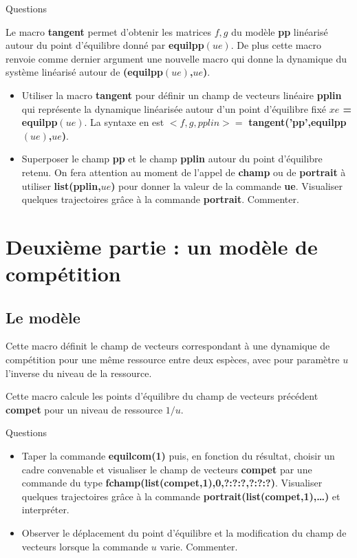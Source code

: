 \centerline{{\sc Questions}}

Le macro {\bf tangent} permet d'obtenir les matrices $f,g$
du mod\`ele {\bf pp}
lin\'earis\'e autour du point d'\'equilibre donn\'e par {\bf equilpp$(ue)$}. 
De plus cette macro renvoie comme dernier argument une nouvelle macro 
qui donne la dynamique
du syst\`eme lin\'earis\'e autour de {\bf (equilpp$(ue)$,$ue$)}.

\begin{itemize}
\item Utiliser la macro {\bf tangent}  pour d\'efinir un champ de vecteurs
lin\'eaire {\bf pplin} qui repr\'esente la dynamique lin\'earis\'ee
autour d'un point d'\'equilibre fix\'e {\bf $xe$ = equilpp$(ue)$}. 
La syntaxe en est $<f,g,pplin>=$ {\bf tangent('pp',equilpp$(ue)$,$ue$)}.

\item Superposer le champ {\bf pp} et le champ {\bf pplin}
autour du point d'\'equilibre retenu. On fera attention au moment de l'appel
 de {\bf champ} ou de {\bf portrait} \`a utiliser {\bf list(pplin,$ue$)} 
pour donner la valeur de la commande {\bf ue}.
Visualiser quelques trajectoires
gr\^ace \`a la commande {\bf portrait}. Commenter.
\end{itemize}

\section{Deuxi\`eme partie : un mod\`ele de comp\'etition}

\subsection{Le mod\`ele}


Cette macro d\'efinit le champ de vecteurs correspondant \`a une dynamique
de comp\'etition pour une m\^eme ressource entre deux esp\`eces, 
avec pour param\`etre $u$ l'inverse du niveau de la ressource.
\medskip

\Mcompet


Cette macro calcule les points d'\'equilibre du champ de vecteurs
pr\'ec\'edent {\bf compet} pour un niveau de ressource $1/u$.
\medskip

\Mequilcom

\centerline{{\sc Questions}}

\begin{itemize}
\item Taper la commande {\bf equilcom(1)} puis, en fonction du
r\'esultat, choisir un cadre convenable et visualiser le champ de
vecteurs {\bf compet} par une commande du type 
{\bf fchamp(list(compet,1),0,?:?:?,?:?:?)}. Visualiser quelques trajectoires
gr\^ace \`a la commande {\bf portrait(list(compet,1),\ldots)} et interpr\'eter.
\item Observer le d\'eplacement du point d'\'equilibre 
et la modification du champ de vecteurs lorsque la commande $u$
varie. Commenter.
\end{itemize}

